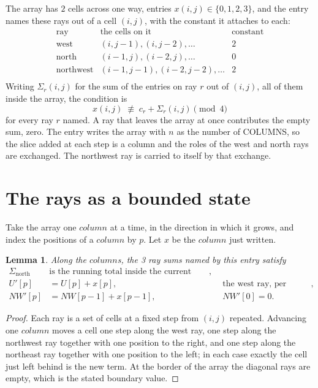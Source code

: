 \documentclass[11pt,a4paper]{article}
\theoremstyle{plain}
\newtheorem{lemma}[theorem]{Lemma}
\theoremstyle{definition}
\begin{document}
The array has $2$ cells across one way, entries $x(i,j)\in\{0,1,2,3\}$, and the entry names these
rays out of a cell $(i,j)$, with the constant it attaches to each:
\[
\begin{array}{lll}
\text{ray} & \text{the cells on it} & \text{constant} \\[2pt]
\text{west} & (i,j-1),(i,j-2),\dots & 2 \\
\text{north} & (i-1,j),(i-2,j),\dots & 0 \\
\text{northwest} & (i-1,j-1),(i-2,j-2),\dots & 2 \\
\end{array}
\]
Writing $\Sigma_r(i,j)$ for the sum of the entries on ray $r$ out of $(i,j)$, all of them
inside the array, the condition is
\[
x(i,j)\;\not\equiv\;c_r+\Sigma_r(i,j) \pmod{4}
\]
for every ray $r$ named. A ray that leaves the array at once contributes the empty sum,
zero. The entry writes the array with $n$ as the number of COLUMNS, so the slice added at each step is a column and the roles of the west and north rays are exchanged. The northwest ray is carried to itself by that exchange.

\section{The rays as a bounded state}

Take the array one $column$ at a time, in the direction in which it grows, and index the
positions of a $column $ by $p$. Let $x$ be the $column$ just written.

\begin{lemma}\label{lem:rays}
Along the $column$s, the 3 ray sums named by this entry satisfy
\[
\begin{aligned}
\Sigma_{\mathrm{north}}\ &\text{is the running total inside the current column},\\
U'[p]&=U[p]+x[p], &&\text{the west ray, per position},\\
NW'[p]&=NW[p-1]+x[p-1], && NW'[0]=0 .
\end{aligned}
\]
\end{lemma}

\begin{proof}
Each ray is a set of cells at a fixed step from $(i,j)$ repeated. Advancing one $column$
moves a cell one step along the west ray, one step along the northwest ray together with one
position to the right, and one step along the northeast ray together with one position to the
left; in each case exactly the cell just left behind is the new term. At the border of the
array the diagonal rays are empty, which is the stated boundary value.
\end{proof}
\end{document}
